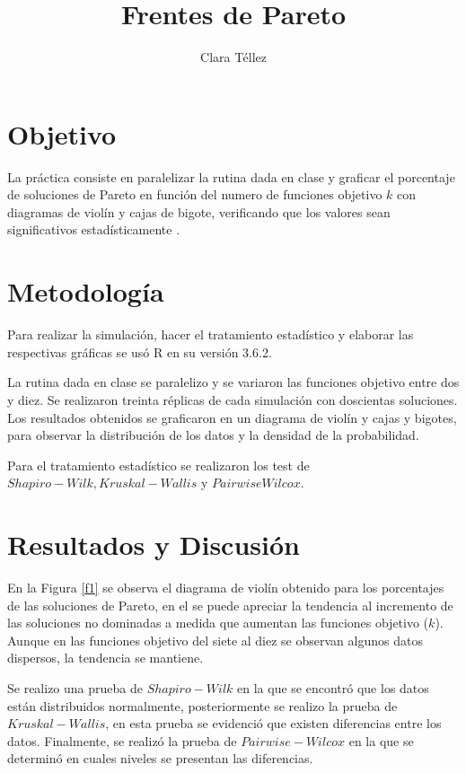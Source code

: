 \documentclass{article}
\begin{document}
\title{\textbf{Frentes de Pareto}}
\author{Clara T\'ellez}
\maketitle

\section{Objetivo}\label{obj}

La pr\'actica consiste en paralelizar la rutina dada en clase y graficar el porcentaje de soluciones de Pareto en funci\'on del numero de funciones objetivo $k$ con diagramas de viol\'in y cajas de bigote, verificando que los valores sean significativos estad\'isticamente \cite{eli}.

\section{Metodolog\'ia}\label{met}

Para realizar la simulaci\'on, hacer el tratamiento estad\'istico y elaborar las respectivas gr\'aficas se us\'o R en su versi\'on 3.6.2.

La rutina dada en clase se paralelizo y se variaron las funciones objetivo entre dos y diez.  Se realizaron treinta r\'eplicas de cada simulaci\'on con doscientas soluciones.  Los resultados obtenidos se graficaron en un diagrama de viol\'in y cajas y bigotes, para observar la distribuci\'on de los datos y la densidad de la probabilidad.

Para el tratamiento estad\'istico se realizaron los test de $Shapiro-Wilk, Kruskal-Wallis$ y $Pairwise Wilcox$.

\section{Resultados y Discusi\'on}\label{res}

En la Figura \ref{f1} se observa el diagrama de viol\'in obtenido para los porcentajes de las soluciones de Pareto, en el se puede apreciar la tendencia al incremento de las soluciones no dominadas a medida que aumentan las funciones objetivo ($k$).  Aunque en las funciones objetivo del siete al diez se observan algunos datos dispersos, la tendencia se mantiene.

Se realizo una prueba de $Shapiro-Wilk$ en la que se encontr\'o que los datos est\'an distribuidos normalmente, posteriormente se realizo la prueba de $Kruskal-Wallis$, en esta prueba se evidenci\'o que existen diferencias entre los datos.  Finalmente, se realiz\'o la prueba de $Pairwise-Wilcox$ en la que se determin\'o en cuales niveles se presentan las diferencias.
\end{document}
